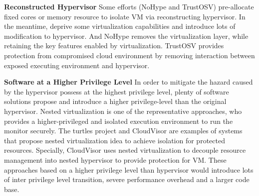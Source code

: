 \documentclass[conference]{IEEEtran}
\begin{document}
\textbf{Reconstructed Hypervisor }
Some efforts (NoHype\cite{NoHype} and TrustOSV\cite{TrustOSV}) pre-allocate fixed cores or memory resource to isolate VM via reconstructing hypervisor. In the meantime, deprive some virtualization capabilities and introduce lots of modification to hypervisor. And NoHype removes the virtualization layer, while retaining the key features enabled by virtualization. TrustOSV provides protection from compromised cloud environment by removing interaction between exposed executing environment and hypervisor.

 
\textbf{Software at a Higher Privilege Level}
In order to mitigate the hazard caused by the hypervisor possess at the highest privilege level, plenty of software solutions propose and introduce a higher privilege-level than the original hypervisor. Nested virtualization is one of the representative approaches, who provides a higher-privileged and isolated 
execution environment to run the monitor securely. The turtles project \cite{Ben2007The} and CloudVisor \cite{Zhang2011CloudVisor} are examples of systems that propose nested virtualization idea to achieve isolation for protected resources. Specially, CloudVisor uses nested virtualization to decouple 
resource management into nested hypervisor to provide protection for VM. These approaches based on a higher privilege level than hypervisor would introduce lots of inter privilege level transition, severe performance overhead and a larger code base.
\end{document}

